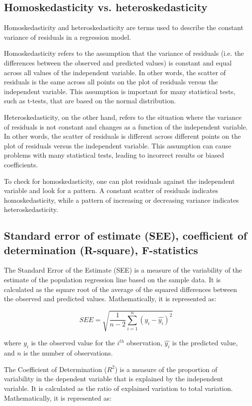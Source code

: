 \documentclass[12pt, a4paper, oneside]{article}
\begin{document}
\subsection{ Homoskedasticity vs. heteroskedasticity  }
Homoskedasticity and heteroskedasticity are terms used to describe the constant variance of residuals in a regression model.

Homoskedasticity refers to the assumption that the variance of residuals (i.e. the differences between the observed and predicted values) is constant and equal across all values of the independent variable. In other words, the scatter of residuals is the same across all points on the plot of residuals versus the independent variable. This assumption is important for many statistical tests, such as t-tests, that are based on the normal distribution.

Heteroskedasticity, on the other hand, refers to the situation where the variance of residuals is not constant and changes as a function of the independent variable. In other words, the scatter of residuals is different across different points on the plot of residuals versus the independent variable. This assumption can cause problems with many statistical tests, leading to incorrect results or biased coefficients.

To check for homoskedasticity, one can plot residuals against the independent variable and look for a pattern. A constant scatter of residuals indicates homoskedasticity, while a pattern of increasing or decreasing variance indicates heteroskedasticity.

\subsection{ Standard error of estimate (SEE), coefficient of determination (R-square), F-statistics }
The Standard Error of the Estimate (SEE) is a measure of the variability of the estimate of the population regression line based on the sample data. It is calculated as the square root of the average of the squared differences between the observed and predicted values. Mathematically, it is represented as:

$$SEE = \sqrt{\frac{1}{n-2} \sum_{i=1}^n (y_i - \hat{y_i})^2}$$

where $y_i$ is the observed value for the $i^{th}$ observation, $\hat{y_i}$ is the predicted value, and $n$ is the number of observations.

The Coefficient of Determination ($R^2$) is a measure of the proportion of variability in the dependent variable that is explained by the independent variable. It is calculated as the ratio of explained variation to total variation. Mathematically, it is represented as:
\end{document}
